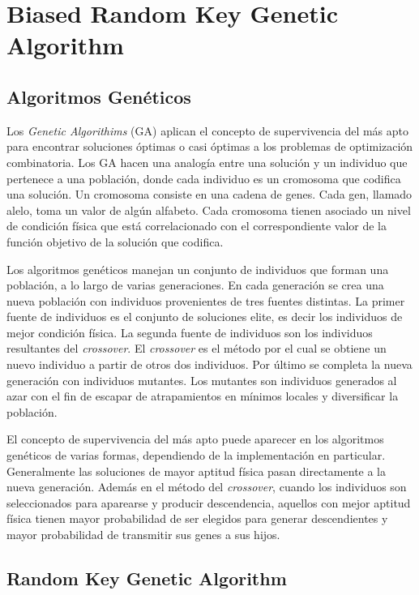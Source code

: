 
\chapter{Biased Random Key Genetic Algorithm}

\section{Algoritmos Genéticos}

Los \textit{Genetic Algorithims} (GA) \cite{Goldberg} aplican el concepto de supervivencia del más apto para encontrar soluciones óptimas o casi óptimas a los problemas de optimización combinatoria. Los GA hacen una analogía entre una solución y un individuo que pertenece a una población, donde cada individuo es un cromosoma que codifica una solución. Un cromosoma consiste en una cadena de genes. Cada gen, llamado alelo, toma un valor de algún alfabeto. Cada cromosoma tienen asociado un nivel de condición física que está correlacionado con el correspondiente valor de la función objetivo de la solución que codifica. 

\bigskip

Los algoritmos genéticos manejan un conjunto de individuos que forman una población, a lo largo de varias generaciones. En cada generación se crea una nueva población con individuos provenientes de tres fuentes distintas. La primer fuente de individuos es el conjunto de soluciones elite, es decir los individuos de mejor condición física. La segunda fuente de individuos son los individuos resultantes del \textit{crossover}. El \textit{crossover} es el método por el cual se obtiene un nuevo individuo a partir de otros dos individuos. Por último se completa la nueva generación con individuos mutantes. Los mutantes son individuos generados al azar con el fin de escapar de atrapamientos en mínimos locales y diversificar la población. 

\bigskip

El concepto de supervivencia del más apto puede aparecer en los algoritmos genéticos de varias formas, dependiendo de la implementación en particular. Generalmente las soluciones de mayor aptitud física pasan directamente a la nueva generación. Además en el método del \textit{crossover}, cuando los individuos son seleccionados para aparearse y producir descendencia, aquellos con mejor aptitud física tienen mayor probabilidad de ser elegidos para generar descendientes y mayor probabilidad de transmitir sus genes a sus hijos.

\section{Random Key Genetic Algorithm}

